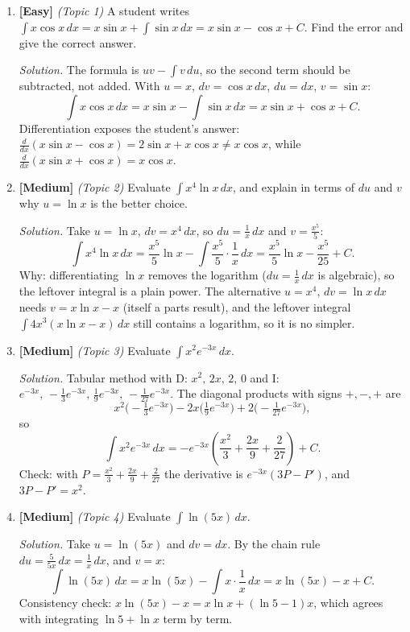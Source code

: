 \documentclass[11pt]{article}
\begin{document}
\begin{enumerate}
\item \textbf{[Easy]} \emph{(Topic 1)} A student writes $\displaystyle\int x\cos x\,dx = x\sin x + \int\sin x\,dx = x\sin x - \cos x + C$. Find the error and give the correct answer.

\textit{Solution.} The formula is $uv - \int v\,du$, so the second term should be subtracted, not added. With $u=x$, $dv=\cos x\,dx$, $du=dx$, $v=\sin x$:
\[ \int x\cos x\,dx = x\sin x - \int\sin x\,dx = x\sin x + \cos x + C. \]
Differentiation exposes the student's answer: $\frac{d}{dx}(x\sin x-\cos x) = 2\sin x + x\cos x\neq x\cos x$, while $\frac{d}{dx}(x\sin x+\cos x)=x\cos x$.

\item \textbf{[Medium]} \emph{(Topic 2)} Evaluate $\displaystyle\int x^4\ln x\,dx$, and explain in terms of $du$ and $v$ why $u=\ln x$ is the better choice.

\textit{Solution.} Take $u=\ln x$, $dv=x^4\,dx$, so $du=\frac1x\,dx$ and $v=\frac{x^5}{5}$:
\[ \int x^4\ln x\,dx = \frac{x^5}{5}\ln x - \int\frac{x^5}{5}\cdot\frac1x\,dx = \frac{x^5}{5}\ln x - \frac{x^5}{25} + C. \]
Why: differentiating $\ln x$ removes the logarithm ($du=\frac1x\,dx$ is algebraic), so the leftover integral is a plain power. The alternative $u=x^4$, $dv=\ln x\,dx$ needs $v=x\ln x-x$ (itself a parts result), and the leftover integral $\int 4x^3(x\ln x-x)\,dx$ still contains a logarithm, so it is no simpler.

\item \textbf{[Medium]} \emph{(Topic 3)} Evaluate $\displaystyle\int x^2e^{-3x}\,dx$.

\textit{Solution.} Tabular method with D: $x^2,\,2x,\,2,\,0$ and I: $e^{-3x},\,-\frac13e^{-3x},\,\frac19e^{-3x},\,-\frac1{27}e^{-3x}$. The diagonal products with signs $+,-,+$ are
\[ x^2\Big(-\tfrac13e^{-3x}\Big) - 2x\Big(\tfrac19e^{-3x}\Big) + 2\Big(-\tfrac1{27}e^{-3x}\Big), \]
so
\[ \int x^2e^{-3x}\,dx = -e^{-3x}\left(\frac{x^2}{3} + \frac{2x}{9} + \frac{2}{27}\right) + C. \]
Check: with $P=\frac{x^2}{3}+\frac{2x}{9}+\frac2{27}$ the derivative is $e^{-3x}(3P-P')$, and $3P-P'=x^2$.

\item \textbf{[Medium]} \emph{(Topic 4)} Evaluate $\displaystyle\int\ln(5x)\,dx$.

\textit{Solution.} Take $u=\ln(5x)$ and $dv=dx$. By the chain rule $du=\frac{5}{5x}\,dx=\frac1x\,dx$, and $v=x$:
\[ \int\ln(5x)\,dx = x\ln(5x) - \int x\cdot\frac1x\,dx = x\ln(5x) - x + C. \]
Consistency check: $x\ln(5x)-x = x\ln x + (\ln5-1)x$, which agrees with integrating $\ln 5+\ln x$ term by term.


\end{enumerate}
\end{document}
